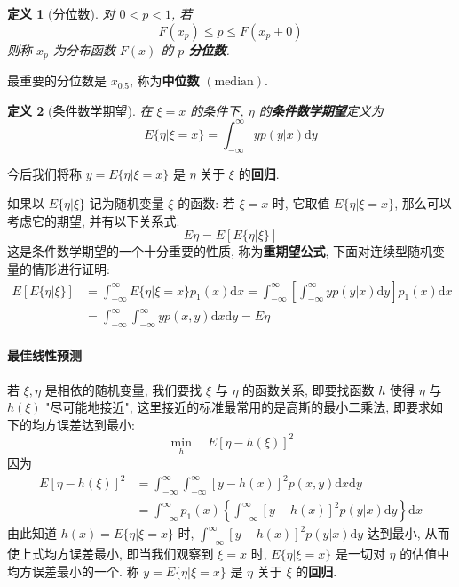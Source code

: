 \documentclass[12pt,a4paper]{article}
\newtheorem{definition}{定义}[subsection] %
\begin{document}
\begin{definition}[分位数]
    对 $0<p<1$, 若 \[ F(x_p) \leq p \leq F(x_p + 0)\] 则称 $x_p$ 为分布函数 $F(x)$ 的 $p$ \textbf{分位数}.
\end{definition}
最重要的分位数是 $x_{0.5}$, 称为\textbf{中位数} $(\mathrm{median})$.

\begin{definition}[条件数学期望]
    在 $\xi = x$ 的条件下, $\eta$ 的\textbf{条件数学期望}定义为 \[ E\{\eta | \xi = x\} = \int_{-\infty}^{\infty} y p(y | x) \mathrm{d}y\]
\end{definition}
今后我们将称 $y = E\{\eta | \xi = x\}$ 是 $\eta$ 关于 $\xi$ 的\textbf{回归}.

如果以 $E\{\eta | \xi\}$ 记为随机变量 $\xi$ 的函数: 若 $\xi = x$ 时, 它取值 $E\{\eta | \xi = x\}$, 那么可以考虑它的期望, 并有以下关系式:
\[E\eta = E[E\{\eta | \xi\}]\] 这是条件数学期望的一个十分重要的性质, 称为\textbf{重期望公式}, 下面对连续型随机变量的情形进行证明:
\[\begin{aligned}
    E[E\{\eta | \xi\}] & = \int_{-\infty}^{\infty} E\{\eta | \xi = x\} p_1(x) \mathrm{d} x = \int_{-\infty}^{\infty} \left[ \int_{-\infty}^{\infty} y p(y|x) \mathrm{d}y \right] p_1(x) \mathrm{d} x\\
    & = \int_{-\infty}^{\infty} \int_{-\infty}^{\infty} y p(x,y) \mathrm{d}x \mathrm{d}y = E\eta
\end{aligned} \]

\paragraph{最佳线性预测} 若 $\xi, \eta$ 是相依的随机变量, 我们要找 $\xi$ 与 $\eta$ 的函数关系, 即要找函数 $h$ 使得 $\eta$ 与 $h(\xi)$ "尽可能地接近", 这里接近的标准最常用的是高斯的最小二乘法, 即要求如下的均方误差达到最小:
\[\underset{h}{\min} \quad E[\eta - h(\xi)]^2\]
因为 
\[\begin{aligned}
E[\eta - h(\xi)]^2 & = \int_{-\infty}^{\infty} \int_{-\infty}^{\infty} [y - h(x)]^2 p(x,y) \mathrm{d}x\mathrm{d}y \\
& = \int_{-\infty}^{\infty} p_1(x) \left\{ \int_{-\infty}^{\infty} [y-h(x)]^2p(y|x) \mathrm{d}y \right\} \mathrm{d}x
\end{aligned}\]
由此知道 $h(x) = E\{\eta | \xi = x\}$ 时, $\int_{-\infty}^{\infty} [y-h(x)]^2 p(y|x) \mathrm{d}y$ 达到最小, 从而使上式均方误差最小, 
即当我们观察到 $\xi = x$ 时, $E\{\eta | \xi = x\}$ 是一切对 $\eta$ 的估值中均方误差最小的一个. 
称 $y = E\{\eta | \xi = x\}$ 是 $\eta$ 关于 $\xi$ 的\textbf{回归}.
\end{document}
